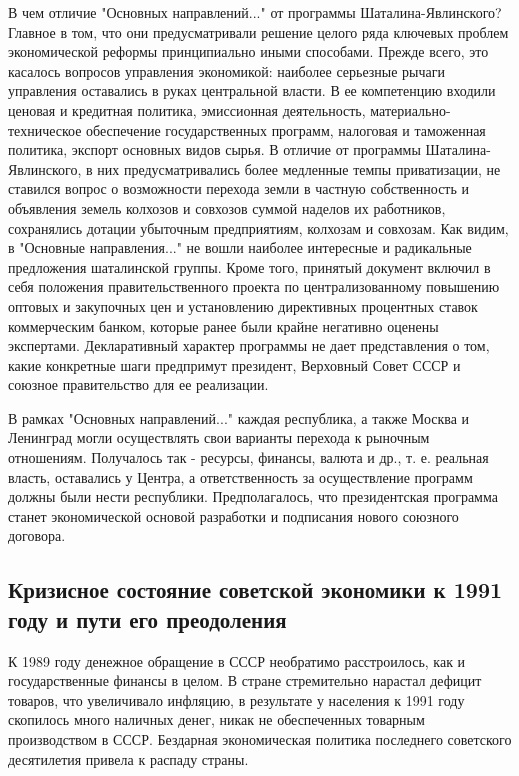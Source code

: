 \documentclass{article}
\begin{document}
В чем отличие "Основных направлений..." от программы Шаталина-Явлинского? Главное в том, что они предусматривали решение целого ряда ключевых проблем экономической реформы принципиально иными способами. Прежде всего, это касалось вопросов управления экономикой: наиболее серьезные рычаги управления оставались в руках центральной власти. В ее компетенцию входили ценовая и кредитная политика, эмиссионная деятельность, материально-техническое обеспечение государственных программ, налоговая и таможенная политика, экспорт основных видов сырья. В отличие от программы Шаталина-Явлинского, в них предусматривались более медленные темпы приватизации, не ставился вопрос о возможности перехода земли в частную собственность и объявления земель колхозов и совхозов суммой наделов их работников, сохранялись дотации убыточным предприятиям, колхозам и совхозам. Как видим, в "Основные направления..." не вошли наиболее интересные и радикальные предложения шаталинской группы. Кроме того, принятый документ включил в себя положения правительственного проекта по централизованному повышению оптовых и закупочных цен и установлению директивных процентных ставок коммерческим банком, которые ранее были крайне негативно оценены экспертами. Декларативный характер программы не дает представления о том, какие конкретные шаги предпримут президент, Верховный Совет СССР и союзное правительство для ее реализации.

\hfill

В рамках "Основных направлений..." каждая республика, а также Москва и Ленинград могли осуществлять свои варианты перехода к рыночным отношениям. Получалось так - ресурсы, финансы, валюта и др., т. е. реальная власть, оставались у Центра, а ответственность за осуществление программ должны были нести республики. Предполагалось, что президентская программа станет экономической основой разработки и подписания нового союзного договора.

\pagebreak
\subsection{Кризисное состояние советской экономики к 1991 году и пути его преодоления}

К 1989 году денежное обращение в СССР необратимо расстроилось, как и государственные финансы в целом. В стране стремительно нарастал дефицит товаров, что увеличивало инфляцию, в результате у населения к 1991 году скопилось много наличных денег, никак не обеспеченных товарным производством в СССР. Бездарная экономическая политика последнего советского десятилетия привела к распаду страны.
\end{document}
